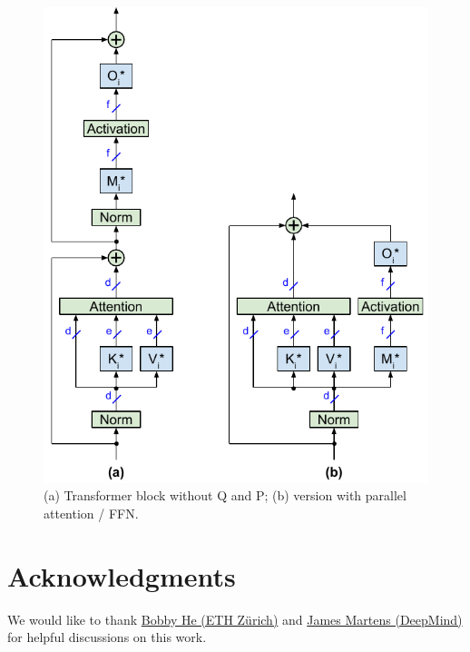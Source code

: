 \documentclass{article}
\begin{document}
\begin{figure} \centering
  \includegraphics[scale=0.92]{../doc/fig/removeWeights_fig4.pdf}
  \caption{(a) Transformer block without Q and P; (b) version with parallel attention / FFN.}
\label{fig4} \end{figure}

\section*{Acknowledgments}
We would like to thank \href{https://scholar.google.com/citations?user=HKft_LAAAAAJ&hl=en}{Bobby He (ETH Zürich)} and \href{https://scholar.google.com/citations?user=LlK_saMAAAAJ&hl=en}{James Martens (DeepMind)} for helpful discussions on this work.



\end{document}
